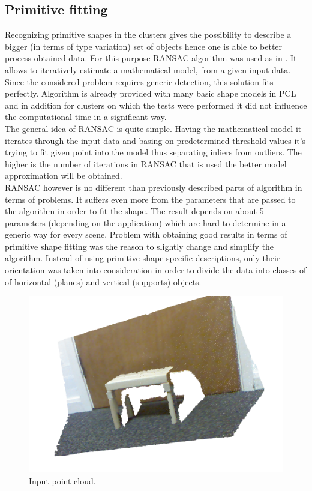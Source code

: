 \documentclass[fontsize=12pt]{article}
\begin{document}
\subsection{Primitive fitting}
Recognizing primitive shapes in the clusters gives the possibility to describe a bigger (in terms of type variation) set of objects hence one is able to better process obtained data. For this purpose RANSAC algorithm was used as in \cite{pap1}. It allows to iteratively estimate a mathematical model, from a given input data. Since the considered problem requires generic detection, this solution fits perfectly. Algorithm is already provided with many basic shape models in PCL and in addition for clusters on which the tests were performed it did not influence the computational time in a significant way.\\
\newline
\indent The general idea of RANSAC is quite simple. Having the mathematical model it iterates through the input data and basing on predetermined threshold values it's trying to fit given point into the model thus separating inliers from outliers. The higher is the number of iterations in RANSAC that is used the better model approximation will be obtained.\\
\newline
\indent RANSAC however is no different than previously described parts of algorithm in terms of problems. It suffers even more from the parameters that are passed to the algorithm in order to fit the shape. The result depends on about 5 parameters (depending on the application) which are hard to determine in a generic way for every scene. Problem with obtaining good results in terms of primitive shape fitting was the reason to slightly change and simplify the algorithm. Instead of using primitive shape specific descriptions, only their orientation was taken into consideration in order to divide the data into classes of of horizontal (planes) and vertical (supports) objects.  
\begin{figure}
  \begin{center}
    \includegraphics[scale=0.5]{images/rgbTable}
    \caption{Input point cloud.}
    \label{fig:rgbTable}
  \end{center}
\end{figure}
\end{document}
